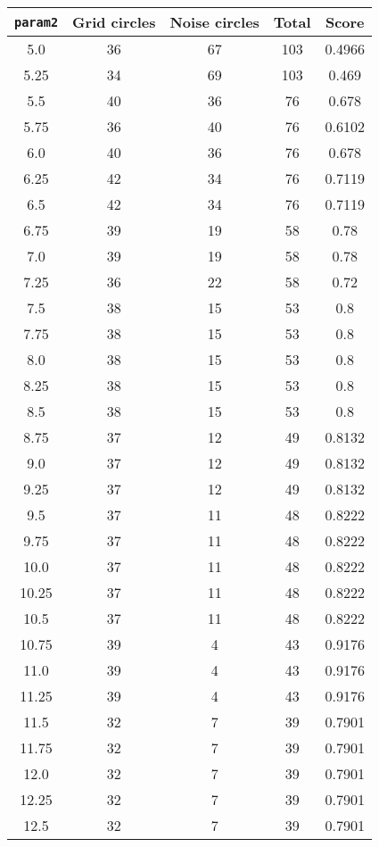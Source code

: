 \documentclass[letterpaper, 12pt]{article}
\begin{document}
\begin{longtable}{|c|c|c|c|c|}
\hline
\textbf{\texttt{param2}} & \textbf{Grid circles} & \textbf{Noise circles} & \textbf{Total} & \textbf{Score} \\
\hline
5.0 & 36 & 67 & 103 & 0.4966 \\
\hline
5.25 & 34 & 69 & 103 & 0.469 \\
\hline
5.5 & 40 & 36 & 76 & 0.678 \\
\hline
5.75 & 36 & 40 & 76 & 0.6102 \\
\hline
6.0 & 40 & 36 & 76 & 0.678 \\
\hline
6.25 & 42 & 34 & 76 & 0.7119 \\
\hline
6.5 & 42 & 34 & 76 & 0.7119 \\
\hline
6.75 & 39 & 19 & 58 & 0.78 \\
\hline
7.0 & 39 & 19 & 58 & 0.78 \\
\hline
7.25 & 36 & 22 & 58 & 0.72 \\
\hline
7.5 & 38 & 15 & 53 & 0.8 \\
\hline
7.75 & 38 & 15 & 53 & 0.8 \\
\hline
8.0 & 38 & 15 & 53 & 0.8 \\
\hline
8.25 & 38 & 15 & 53 & 0.8 \\
\hline
8.5 & 38 & 15 & 53 & 0.8 \\
\hline
8.75 & 37 & 12 & 49 & 0.8132 \\
\hline
9.0 & 37 & 12 & 49 & 0.8132 \\
\hline
9.25 & 37 & 12 & 49 & 0.8132 \\
\hline
9.5 & 37 & 11 & 48 & 0.8222 \\
\hline
9.75 & 37 & 11 & 48 & 0.8222 \\
\hline
10.0 & 37 & 11 & 48 & 0.8222 \\
\hline
10.25 & 37 & 11 & 48 & 0.8222 \\
\hline
10.5 & 37 & 11 & 48 & 0.8222 \\
\hline
10.75 & 39 & 4 & 43 & 0.9176 \\
\hline
11.0 & 39 & 4 & 43 & 0.9176 \\
\hline
11.25 & 39 & 4 & 43 & 0.9176 \\
\hline
11.5 & 32 & 7 & 39 & 0.7901 \\
\hline
11.75 & 32 & 7 & 39 & 0.7901 \\
\hline
12.0 & 32 & 7 & 39 & 0.7901 \\
\hline
12.25 & 32 & 7 & 39 & 0.7901 \\
\hline
12.5 & 32 & 7 & 39 & 0.7901 \\

\end{longtable}
\end{document}
